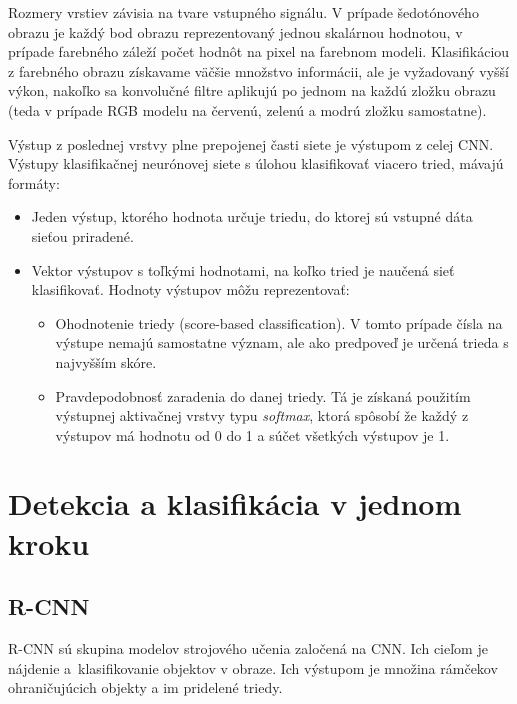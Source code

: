         Rozmery vrstiev závisia na tvare vstupného signálu. V prípade šedotónového obrazu je každý bod obrazu reprezentovaný jednou skalárnou hodnotou, v prípade farebného záleží počet hodnôt na pixel na farebnom modeli. Klasifikáciou z farebného obrazu získavame väčšie množstvo informácii, ale je vyžadovaný vyšší výkon, nakoľko sa konvolučné filtre aplikujú po jednom na každú zložku obrazu (teda v prípade RGB modelu na červenú, zelenú a modrú zložku samostatne).

        Výstup z poslednej vrstvy plne prepojenej časti siete je výstupom z celej \ac{CNN}. Výstupy klasifikačnej neurónovej siete s úlohou klasifikovať viacero tried, mávajú formáty:

        \begin{itemize}
            \item Jeden výstup, ktorého hodnota určuje triedu, do ktorej sú vstupné dáta sieťou priradené.
            \item Vektor výstupov s toľkými hodnotami, na koľko tried je naučená sieť klasifikovať. Hodnoty výstupov môžu reprezentovať:
            \begin{itemize}
                \item Ohodnotenie triedy (score-based classification). V tomto prípade čísla na výstupe nemajú samostatne význam, ale ako predpoveď je určená trieda s najvyšším skóre.
                \item Pravdepodobnosť zaradenia do danej triedy. Tá je získaná použitím výstupnej aktivačnej vrstvy typu \emph{softmax}, ktorá spôsobí že každý z výstupov má hodnotu od 0 do 1 a súčet všetkých výstupov je 1.
            \end{itemize}
        \end{itemize}
        

\chapter{Detekcia a klasifikácia v jednom kroku}

    \section{R-CNN}

        \ac{R-CNN} sú skupina modelov strojového učenia zaločená na \ac{CNN}. Ich cieľom je nájdenie a~klasifikovanie objektov v obraze. Ich výstupom je množina rámčekov ohraničujúcich objekty a im pridelené triedy.

